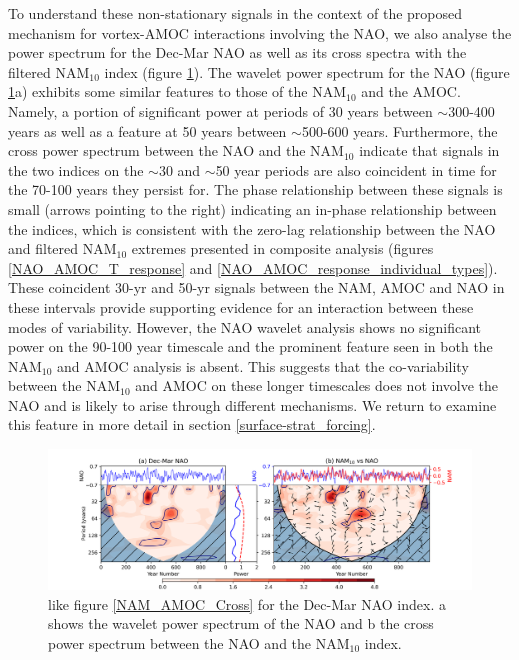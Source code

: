 To understand these non-stationary signals in the context of the proposed mechanism for vortex-AMOC interactions involving the NAO, we also analyse the power spectrum for the Dec-Mar NAO as well as its cross spectra with the filtered NAM$_{10}$ index (figure \ref{NAO_NAM_Cross}). The wavelet power spectrum for the NAO (figure \ref{NAO_NAM_Cross}a) exhibits some similar features to those of the NAM$_{10}$ and the AMOC. Namely, a portion of significant power at periods of 30 years between $\sim$300-400 years as well as a feature at 50 years between $\sim$500-600 years. Furthermore, the cross power spectrum between the NAO and the NAM$_{10}$ indicate that signals in the two indices on the $\sim$30 and $\sim$50 year periods are also coincident in time for the 70-100 years they persist for. The phase relationship between these signals is small (arrows pointing to the right) indicating an in-phase relationship between the indices, which is consistent with the zero-lag relationship between the NAO and filtered NAM$_{10}$ extremes presented in composite analysis (figures \ref{NAO_AMOC_T_response} and \ref{NAO_AMOC_response_individual_types}). These coincident 30-yr and 50-yr signals between the NAM, AMOC and NAO in these intervals provide supporting evidence for an interaction between these modes of variability. However, the NAO wavelet analysis shows no significant power on the 90-100 year timescale and the prominent feature seen in both the NAM$_{10}$ and AMOC analysis is absent. This suggests that the co-variability between the NAM$_{10}$ and AMOC on these longer timescales does not involve the NAO and is likely to arise through different mechanisms. We return to examine this feature in more detail in section \ref{surface-strat_forcing}.

\begin{figure}[h!]
\begin{center}
\noindent\includegraphics[width = \linewidth]{Figures/Figures-surface/NAM_NAO_filtered_subplot.png}
\caption{like figure \ref{NAM_AMOC_Cross} for the Dec-Mar NAO index. a shows the wavelet power spectrum of the NAO and b the cross power spectrum between the NAO and the NAM$_{10}$ index.}
\label{NAO_NAM_Cross}
\end{center}
\end{figure}

